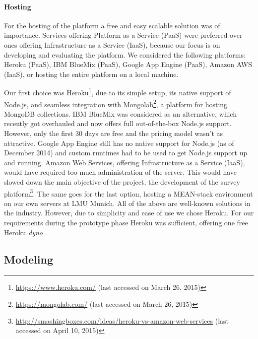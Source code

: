 	\paragraph{Hosting}

		For the hosting of the platform a free and easy scalable solution was of importance. Services offering Platform as a Service (PaaS) were preferred over ones offering Infrastructure as a Service (IaaS), because our focus is on developing and evaluating the platform. We considered the following platforms: Heroku (PaaS), IBM BlueMix (PaaS), Google App Engine (PaaS), Amazon AWS (IaaS), or hosting the entire platform on a local machine.

		Our first choice was Heroku\footnote{\url{https://www.heroku.com/} (last accessed on March 26, 2015)}, due to its simple setup, its native support of Node.js, and seamless integration with Mongolab\footnote{\url{https://mongolab.com/} (last accessed on March 26, 2015)}, a platform for hosting MongoDB collections.
		IBM BlueMix was considered as an alternative, which recently got overhauled and now offers full out-of-the-box Node.js support. However, only the first 30 days are free and the pricing model wasn't as attractive. Google App Engine still has no native support for Node.js (as of December 2014) and custom runtimes had to be used to get Node.js support up and running. Amazon Web Services, offering Infrastructure as a Service (IaaS), would have required too much administration of the server. This would have slowed down the main objective of the project, the development of the survey platform\footnote{\url{http://smashingboxes.com/ideas/heroku-vs-amazon-web-services} (last accessed on April 10, 2015)}. The same goes for the last option, hosting a MEAN-stack environment on our own servers at LMU Munich. All of the above are well-known solutions in the industry. However, due to simplicity and ease of use we chose Heroku. For our requirements during the prototype phase Heroku was sufficient, offering one free Heroku \textit{dyno} \cite{Heroku2014Dyno}.






\clearpage

\subsection{Modeling}
\label{chapter:implementation:modeling}

